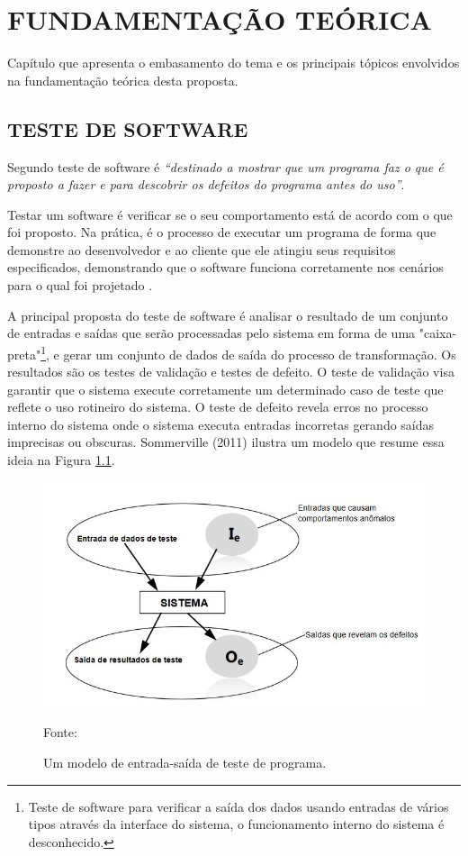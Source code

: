 
\chapter{FUNDAMENTAÇÃO TEÓRICA}
\label{chap:fundamentacaoTeorica}

Capítulo que apresenta o embasamento do tema e os principais tópicos envolvidos na fundamentação teórica desta proposta.

\section{TESTE DE SOFTWARE}

Segundo \cite[p.~144]{SOMMER2011} teste de software é \textit{“destinado a mostrar que um programa faz o que é proposto a fazer e para descobrir os defeitos do programa antes do uso”}.

Testar um software é verificar se o seu comportamento está de acordo com o que foi proposto. Na prática, é o processo de executar um programa de forma que demonstre ao desenvolvedor e ao cliente que ele atingiu seus requisitos especificados, demonstrando que o software funciona corretamente nos cenários para o qual foi projetado \cite{SOMMER2011}.

A principal proposta do teste de software é analisar o resultado de um conjunto de entradas e saídas que serão processadas pelo sistema em forma de uma "caixa-preta"\footnote{Teste de software para verificar a saída dos dados usando entradas de vários tipos através da interface do sistema, o funcionamento interno do sistema é desconhecido.}, e gerar um conjunto de dados de saída do processo de transformação. Os resultados são os testes de validação e testes de defeito. O teste de validação visa garantir que o sistema execute corretamente um determinado caso de teste que reflete o uso rotineiro do sistema. O teste de defeito revela erros no processo interno do sistema onde o sistema executa entradas incorretas gerando saídas imprecisas ou obscuras. Sommerville (2011) ilustra um modelo que resume essa ideia na Figura \ref{modeloEntradaSaida}.  

\begin{figure}[h!]
	\centering
	\includegraphics[scale=0.7]{dados/figuras/modelo_entradaSaida.JPG}
	\caption{Um modelo de entrada-saída de teste de programa.}
	Fonte: \cite[p.~145]{SOMMER2011}
	\label{modeloEntradaSaida}
\end{figure}


